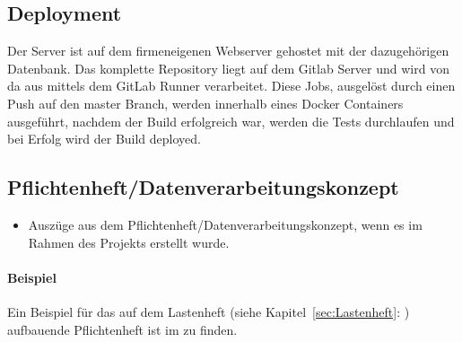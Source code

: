 \subsection{Deployment}
\label{sec:Deployment}

Der Server ist auf dem firmeneigenen Webserver gehostet mit der dazugehörigen Datenbank. Das komplette Repository liegt auf dem Gitlab Server und wird von da aus mittels dem GitLab Runner verarbeitet. Diese Jobs, ausgelöst durch einen Push auf den master Branch, werden innerhalb eines Docker Containers ausgeführt, nachdem der Build erfolgreich war, werden die Tests durchlaufen und bei Erfolg wird der Build deployed. 

\subsection{Pflichtenheft/Datenverarbeitungskonzept}
\label{sec:Pflichtenheft}
\begin{itemize}
	\item Auszüge aus dem Pflichtenheft/Datenverarbeitungskonzept, wenn es im Rahmen des Projekts erstellt wurde.
\end{itemize}

\paragraph{Beispiel}
Ein Beispiel für das auf dem Lastenheft (siehe Kapitel~\ref{sec:Lastenheft}: ) aufbauende Pflichtenheft ist im  zu finden.


